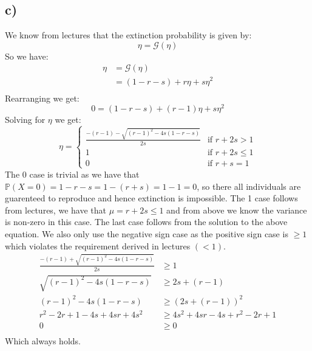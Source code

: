 \documentclass{article}
\begin{document}
\subsection*{c)}
We know from lectures that the extinction probability is given by:
$$\eta=\mathcal{G}(\eta)$$
So we have:
\begin{align*}
\eta&=\mathcal{G}(\eta)\\
&=(1-r-s)+r\eta+s\eta^2\\
\end{align*}
Rearranging we get:
$$0=(1-r-s)+(r-1)\eta+s\eta^2$$
Solving for $\eta$ we get:
$$\eta=\begin{cases}
        \frac{-(r-1)-\sqrt{(r-1)^2-4s(1-r-s)}}{2s} & \text{if } r+2s>1\\
        1 & \text{if } r+2s\leq1\\
        0 & \text{if } r+s=1
    \end{cases}$$
The 0 case is trivial as we have that $\mathbb{P}(X=0)=1-r-s=1-(r+s)=1-1=0$, so there all individuals are guarenteed to reproduce and hence extinction is impossible. The 1 case follows from lectures, we have that $\mu=r+2s\leq1$ and from above we know the variance is non-zero in this case. The last case follows from the solution to the above equation. We also only use the negative sign case as the positive sign case is $\geq1$ which violates the requirement derived in lectures $(<1)$.
\begin{align*}
\frac{-(r-1)+\sqrt{(r-1)^2-4s(1-r-s)}}{2s}&\geq1\\
\sqrt{(r-1)^2-4s(1-r-s)}&\geq2s+(r-1)\\
(r-1)^2-4s(1-r-s)&\geq(2s+(r-1))^2\\
r^2-2r+1-4s+4sr+4s^2&\geq4s^2+4sr-4s+r^2-2r+1\\
0&\geq0\\
\end{align*}
Which always holds.  
\end{document}
